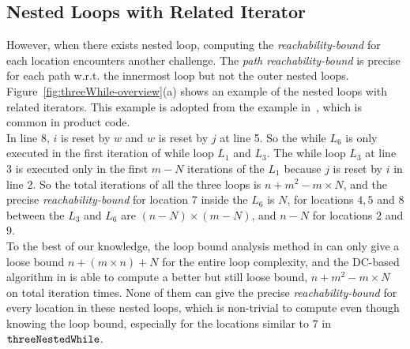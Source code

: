 \subsection{Nested Loops with Related Iterator}
\label{sec:overview-nestedwhile}
However, when there exists nested loop, computing the \emph{reachability-bound} for each location encounters another challenge.
The \emph{path reachability-bound} is precise for each path w.r.t. the innermost loop but not the outer nested loops.
Figure~\ref{fig:threeWhile-overview}(a) shows an example of the nested loops with related 
iterators.
This example is adopted from the example in~\cite{GulwaniJK09}, which is common in product code.
\\
In line 8, $i$ is reset by $w$ and $w$ is reset by $j$ at line 5. So the
while $L_6$ is only executed in the first iteration of while loop $L_1$ and $L_3$.
The while loop $L_3$ at line 3 is executed only in 
the first $m - N$ iterations of the 
$L_1$ because $j$ is reset by $i$ in line 2.
So the total iterations of all the three loops is
$n + m^2 - m \times N$,
and the precise \emph{reachability-bound} for location $7$ inside the $L_6$ is $N$,
for locations $4, 5$ and $8$ between the $L_3$ and $L_6$ are $(n-N) \times (m - N)$,
and $n - N$ for locations $2$ and $9$.
\\
To the best of our knowledge, the loop bound analysis method in \cite{GulwaniJK09} can only give a loose bound $n + (m \times n) + N$ for the entire loop complexity, and 
the DC-based algorithm in \cite{SinnZV17} is able to
compute a better but still loose bound, $n + m^2 - m \times N$ on total iteration times.
None of them can give the precise \emph{reachability-bound} for every location in these nested loops,
which is non-trivial to compute even though knowing the loop bound,
especially for the locations similar to $7$ in $\mathtt{threeNestedWhile}$.
\\
